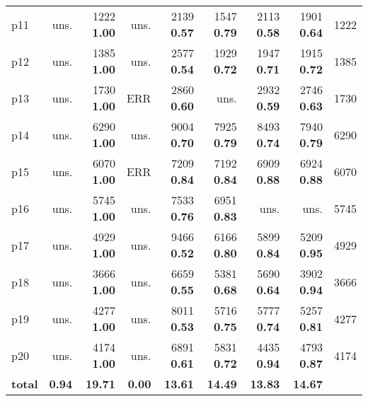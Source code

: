 \begin{tabular}{|l|rrrrrrr|r|}
p11 & uns. & {\footnotesize 1222} \textbf{1.00} & uns. & {\footnotesize 2139} \textbf{0.57} & {\footnotesize 1547} \textbf{0.79} & {\footnotesize 2113} \textbf{0.58} & {\footnotesize 1901} \textbf{0.64} & 1222\\
p12 & uns. & {\footnotesize 1385} \textbf{1.00} & uns. & {\footnotesize 2577} \textbf{0.54} & {\footnotesize 1929} \textbf{0.72} & {\footnotesize 1947} \textbf{0.71} & {\footnotesize 1915} \textbf{0.72} & 1385\\
p13 & uns. & {\footnotesize 1730} \textbf{1.00} & ERR & {\footnotesize 2860} \textbf{0.60} & uns. & {\footnotesize 2932} \textbf{0.59} & {\footnotesize 2746} \textbf{0.63} & 1730\\
p14 & uns. & {\footnotesize 6290} \textbf{1.00} & uns. & {\footnotesize 9004} \textbf{0.70} & {\footnotesize 7925} \textbf{0.79} & {\footnotesize 8493} \textbf{0.74} & {\footnotesize 7940} \textbf{0.79} & 6290\\
p15 & uns. & {\footnotesize 6070} \textbf{1.00} & ERR & {\footnotesize 7209} \textbf{0.84} & {\footnotesize 7192} \textbf{0.84} & {\footnotesize 6909} \textbf{0.88} & {\footnotesize 6924} \textbf{0.88} & 6070\\
p16 & uns. & {\footnotesize 5745} \textbf{1.00} & uns. & {\footnotesize 7533} \textbf{0.76} & {\footnotesize 6951} \textbf{0.83} & uns. & uns. & 5745\\
p17 & uns. & {\footnotesize 4929} \textbf{1.00} & uns. & {\footnotesize 9466} \textbf{0.52} & {\footnotesize 6166} \textbf{0.80} & {\footnotesize 5899} \textbf{0.84} & {\footnotesize 5209} \textbf{0.95} & 4929\\
p18 & uns. & {\footnotesize 3666} \textbf{1.00} & uns. & {\footnotesize 6659} \textbf{0.55} & {\footnotesize 5381} \textbf{0.68} & {\footnotesize 5690} \textbf{0.64} & {\footnotesize 3902} \textbf{0.94} & 3666\\
p19 & uns. & {\footnotesize 4277} \textbf{1.00} & uns. & {\footnotesize 8011} \textbf{0.53} & {\footnotesize 5716} \textbf{0.75} & {\footnotesize 5777} \textbf{0.74} & {\footnotesize 5257} \textbf{0.81} & 4277\\
p20 & uns. & {\footnotesize 4174} \textbf{1.00} & uns. & {\footnotesize 6891} \textbf{0.61} & {\footnotesize 5831} \textbf{0.72} & {\footnotesize 4435} \textbf{0.94} & {\footnotesize 4793} \textbf{0.87} & 4174\\
\hline
\textbf{total} & \textbf{0.94} & \textbf{19.71} & \textbf{0.00} & \textbf{13.61} & \textbf{14.49} & \textbf{13.83} & \textbf{14.67} & \\
\hline
\end{tabular}

